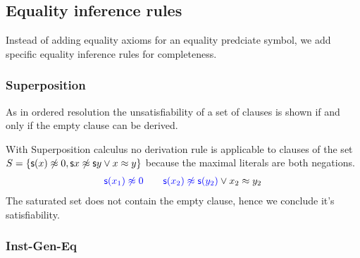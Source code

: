 
\subsection{Equality inference rules}

Instead of adding equality axioms for an equality predciate symbol,
we add specific equality inference rules for completeness.


\subsubsection{Superposition}\label{sec:superposition}

As in ordered resolution the unsatisfiability of a set of clauses is shown
if and only if the empty clause can be derived. 




\begin{example} With Superposition calculus no derivation rule is applicable
	to clauses of the set \(S = \{ \mathsf{s}(x)\not\approx 0, \mathsf{s}{x}\not\approx\mathsf{s}{y} \lor x\approx y  \}\)
	because the maximal literals are both negations.
	\begin{align*}
	{\colN \msucc(x_1) \mNE 0}\qquad{\colN \msucc(x_2) \mNE \msucc(y_2)} \lor x_2\mEQ y_2
	\end{align*}
	The saturated set does not contain the empty clause, hence we conclude it's satisfiability.
\end{example}

\subsubsection{Inst-Gen-Eq}\label{sec:inst:gen:eq}

